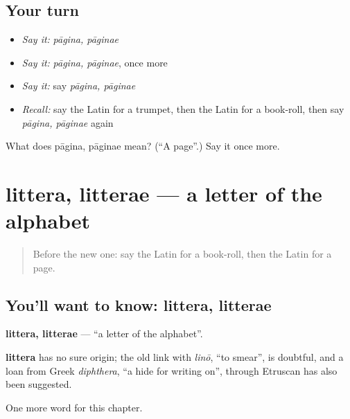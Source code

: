 \subsection*{Your turn}
\begin{itemize}
\raggedright
  \item \emph{Say it:} \emph{pāgina, pāginae}
  \item \emph{Say it:} \emph{pāgina, pāginae}, once more
  \item \emph{Say it:} say \emph{pāgina, pāginae}
  \item \emph{Recall:} say the Latin for a trumpet, then the Latin for a book-roll, then say \emph{pāgina, pāginae} again
\end{itemize}

\begin{tcolorbox}[breakable,colback=teal!4,colframe=teal!35!black,title={Before you move on}]
What does pāgina, pāginae mean? (\textquotedblleft{}A page\textquotedblright{}.) Say it once more.
\end{tcolorbox}
\section[littera, litterae]{littera, litterae — a letter of the alphabet}

\label{lesson:LA-C278-littera}



\begin{quote}
Before the new one: say the Latin for a book-roll, then the Latin for a page.
\end{quote}

\subsection*{You'll want to know: littera, litterae}
\textbf{littera, litterae} — \textquotedblleft{}a letter of the alphabet\textquotedblright{}.

\begin{cousinweb}
\textbf{littera} has no sure origin; the old link with \emph{linō}, \textquotedblleft{}to smear\textquotedblright{}, is doubtful, and a loan from Greek \emph{diphthera}, \textquotedblleft{}a hide for writing on\textquotedblright{}, through Etruscan has also been suggested.
\end{cousinweb}

\begin{grammarlens}[title={What you've built}]
One more word for this chapter.
\end{grammarlens}

